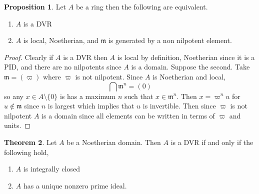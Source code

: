 \documentclass[12pt]{article}
\newcommand{\m}{\mathfrak{m}}
\theoremstyle{remark}
\theoremstyle{definition}
\newtheorem{theorem}{Theorem}[section]
\newtheorem{proposition}[theorem]{Proposition}
\begin{document}
\begin{proposition}
Let $A$ be a ring then the following are equivalent.
\begin{enumerate}
\item $A$ is a DVR
\item $A$ is local, Noetherian, and $\m$ is generated by a non nilpotent element.
\end{enumerate}
\end{proposition}

\begin{proof}
Clearly if $A$ is a DVR then $A$ is local by definition, Noetherian since it is a PID, and there are no nilpotents since $A$ is a domain. Suppose the second. Take $\m = (\varpi)$ where $\varpi$ is not nilpotent. Since $A$ is Noetherian and local,
\[ \bigcap \m^n = (0) \]
so any $x \in A \setminus \{0\}$ is has a maximum $n$ such that $x \in \m^n$. Then $x = \varpi^n u$ for $u \notin \m$ since $n$ is largest which implies that $u$ is invertible. Then since $\varpi$ is not nilpotent $A$ is a domain since all elements can be written in terms of $\varpi$ and units.  
\end{proof}

\begin{theorem}
Let $A$ be a Noetherian domain. Then $A$ is a DVR if and only if the following hold,
\begin{enumerate}
\item $A$ is integrally closed
\item $A$ has a unique nonzero prime ideal.
\end{enumerate}
\end{theorem}
\end{document}
